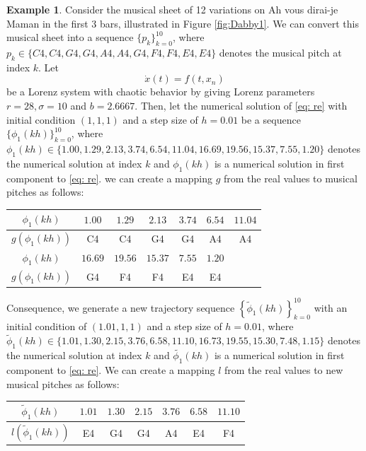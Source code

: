 \documentclass[11pt]{article}
\theoremstyle{definition}
\newtheorem{example}[theorem]{Example}
\begin{document}
\begin{example}
Consider the musical sheet of 12 variations on Ah vous dirai-je Maman \cite{hinson_12_1987} in the first 3 bars, illustrated in Figure \ref{fig:Dabby1}. We can convert this musical sheet into a sequence $\{p_k\}_{k=0}^{10}$, where $p_k \in \{C4, C4, G4, G4, A4, A4, G4, F4, F4, E4, E4 \}$ denotes the musical pitch at index $k$. Let 
\begin{equation} \label{eq: re}
\dot{x}(t) = f(t , x_n)
\end{equation} be a Lorenz system with chaotic behavior by giving Lorenz parameters $r = 28, \sigma=10$ and $b = 2.6667$. Then, let the numerical solution of \eqref{eq: re} with initial condition $(1,1,1)$ and a step size of $h=0.01$ be a sequence $\{ \phi_1(kh) \}_{k=0}^{10}$, where $ \phi_1(kh) \in \{1.00, 1.29, 2.13, 3.74, 6.54, 11.04, 16.69, 19.56, 15.37, 7.55, 1.20\}$ denotes the numerical solution at index $k$ and $\phi_1(kh)$ is a numerical solution in first component to \eqref{eq: re}. we can create a mapping $g$ from the real values to musical pitches as follows:
\begin{center}
\begin{tabular}{|c||c|c|c|c|c|c|}
\hline
$ \phi_1(kh) $ & $1.00$ & $1.29$ & $2.13$ & $3.74$ & $6.54$ & $11.04$ \\
\hline
$g(\phi_1(kh))$ & C4 & C4 & G4 & G4 & A4 & A4 \\
\hline
$\phi_1(kh)$ & $16.69$ & $19.56$ & $15.37$ & $7.55$ & $1.20$ & \\
\hline
$g(\phi_1(kh))$ & G4 & F4 & F4 & E4 & E4 &  \\
\hline
\end{tabular}
\end{center}
Consequence, we generate a new trajectory sequence $\left\{\tilde{\phi}_1(kh) \right\}_{k=0}^{10}$ with an initial condition of $(1.01,1,1)$ and a step size of $h=0.01$, where $\tilde{\phi}_1(kh) \in \{ 1.01, 1.30, 2.15, 3.76, 6.58, 11.10, 16.73, 19.55, 15.30, 7.48, 1.15 \}$ denotes the numerical solution at index $k$ and $\tilde{\phi_1}(kh)$ is a numerical solution in first component to \eqref{eq: re}. We can create a mapping $l$ from the real values to new musical pitches as follows:
\begin{center}
\begin{tabular}{|c||c|c|c|c|c|c|}
\hline
$\tilde{\phi}_1(kh)$ & $1.01$ & $1.30$ & $2.15$ & $3.76$ & $6.58$ & $11.10$ \\
\hline
$l(\tilde{\phi}_1(kh))$ & E4 & G4 & G4 & A4 & E4 & F4 \\

\end{tabular}
\end{center}
\end{example}
\end{document}
